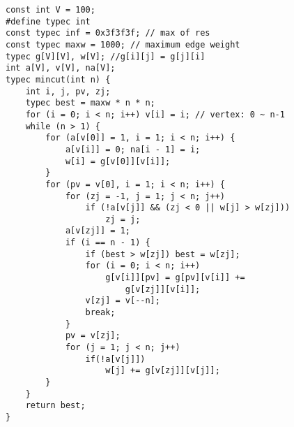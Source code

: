 \begin{lstlisting}
const int V = 100;
#define typec int
const typec inf = 0x3f3f3f; // max of res
const typec maxw = 1000; // maximum edge weight
typec g[V][V], w[V]; //g[i][j] = g[j][i]
int a[V], v[V], na[V];
typec mincut(int n) {
	int i, j, pv, zj;
	typec best = maxw * n * n;
	for (i = 0; i < n; i++) v[i] = i; // vertex: 0 ~ n-1
	while (n > 1) {
		for (a[v[0]] = 1, i = 1; i < n; i++) {
			a[v[i]] = 0; na[i - 1] = i;
			w[i] = g[v[0]][v[i]];
		}
		for (pv = v[0], i = 1; i < n; i++) {
			for (zj = -1, j = 1; j < n; j++)
				if (!a[v[j]] && (zj < 0 || w[j] > w[zj]))
					zj = j;
			a[v[zj]] = 1;
			if (i == n - 1) {
				if (best > w[zj]) best = w[zj];
				for (i = 0; i < n; i++)
					g[v[i]][pv] = g[pv][v[i]] +=
						g[v[zj]][v[i]];
				v[zj] = v[--n];
				break;
			}
			pv = v[zj];
			for (j = 1; j < n; j++)
				if(!a[v[j]])
					w[j] += g[v[zj]][v[j]];
		}
	}
	return best;
}
\end{lstlisting}
